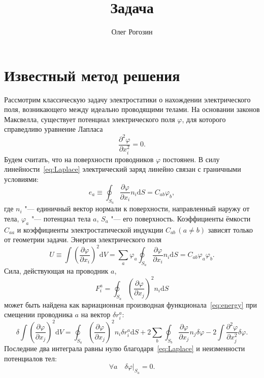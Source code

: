 \documentclass{article}
\title{Задача}
\author{Олег Рогозин}
\theoremstyle{plain}
\newcommand{\dd}{\mathrm{d}}
\newcommand{\pder}[2][]{\frac{\partial#1}{\partial#2}}
\newcommand{\pderdual}[2][]{\frac{\partial^2#1}{\partial#2^2}}
\newcommand{\eqdef}{\equiv}
\begin{document}
\section{Известный метод решения}

Рассмотрим классическую задачу электростатики о нахождении электрического поля,
возникающего между идеально проводящими телами. На основании законов Максвелла,
существует потенциал электрического поля \(\varphi\), для которого справедливо
уравнение Лапласа
\begin{equation}\label{eq:Laplace}
    \pderdual[\varphi]{x_i} = 0.
\end{equation}
Будем считать, что на поверхности проводников \(\varphi\) постоянен.
В силу линейности~\eqref{eq:Laplace} электрический заряд линейно связан с граничными условиями:
\begin{equation}\label{eq:charge}
    e_a \eqdef \oint_{S_a} \pder[\varphi]{x_i}n_i\dd{S} = C_{ab} \varphi_b,
\end{equation}
где \(n_i\) "--- единичный вектор нормали к поверхности, направленный наружу от тела,
\(\varphi_a\) "--- потенциал тела \(a\), \(S_a\) "--- его поверхность.
Коэффициенты ёмкости \(C_{aa}\) и коэффициенты электростатической индукции \(C_{ab}\,(a\neq b)\)
зависят только от геометрии задачи.
Энергия электрического поля
\begin{equation}\label{eq:energy}
    U \eqdef \int \left(\pder[\varphi]{x_i}\right)^2\dd{V} =
    \sum_a \varphi_a \oint_{S_a} \pder[\varphi]{x_i}n_i\dd{S} = C_{ab} \varphi_a \varphi_b.
\end{equation}
Сила, действующая на проводник \(a\),
\begin{equation}\label{eq:force}
    F^a_i = \oint_{S_a} \left(\pder[\varphi]{x_j}\right)^2 n_i\dd{S}
\end{equation}
может быть найдена как вариационная производная функционала~\eqref{eq:energy}
при смещении проводника \(a\) на вектор \(\delta r^a_i\):
\begin{equation}\label{eq:variation}
    \delta \int \left(\pder[\varphi]{x_j}\right)^2\dd{V} =
    \oint_{S_a} \left(\pder[\varphi]{x_j}\right)^2 n_i \delta r^a_i \dd{S} +
    2\sum_b \oint_{S_b} \pder[\varphi]{x_j} n_j\delta\varphi - 2\int \pderdual[\varphi]{x_j} \delta\varphi.
\end{equation}
Последние два интеграла равны нулю благодаря~\eqref{eq:Laplace} и неизменности потенциалов тел:
\begin{equation}\label{eq:delta_phi}
    \forall a \quad \delta\varphi|_{S_a} = 0.
\end{equation}
\end{document}
